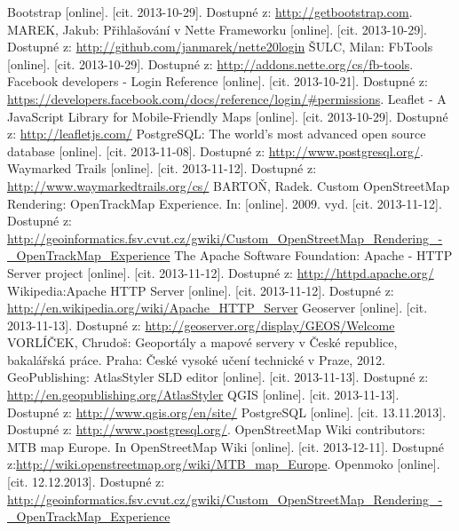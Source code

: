 \documentclass[11pt,a4paper,titlepage,oneside]{book}
\begin{document}
\newpage
{}
\begin{thebibliography}{50}
	Bootstrap [online].  [cit. 2013-10-29]. Dostupné z: \url{http://getbootstrap.com}.
	MAREK, Jakub: Přihlašování v Nette Frameworku [online].  [cit. 2013-10-29]. Dostupné z: \url{http://github.com/janmarek/nette20login}
	 ŠULC, Milan: FbTools [online].  [cit. 2013-10-29]. Dostupné z: \url{http://addons.nette.org/cs/fb-tools}.
	 Facebook developers - Login Reference [online]. [cit. 2013-10-21]. Dostupné z: \url{https://developers.facebook.com/docs/reference/login/#permissions}.
		Leaflet - A JavaScript Library for Mobile-Friendly Maps [online]. [cit. 2013-10-29]. Dostupné z: \url{http://leafletjs.com/}
	 PostgreSQL: The world's most advanced open source database [online]. [cit. 2013-11-08]. Dostupné z: \url{http://www.postgresql.org/}.
	 Waymarked Trails [online].  [cit. 2013-11-12]. Dostupné z: \url{http://www.waymarkedtrails.org/cs/}
	 BARTOŇ, Radek. Custom OpenStreetMap Rendering: OpenTrackMap Experience. In: [online]. 2009. vyd. [cit. 2013-11-12]. Dostupné z: \url{http://geoinformatics.fsv.cvut.cz/gwiki/Custom_OpenStreetMap_Rendering_-_OpenTrackMap_Experience}
	The Apache Software Foundation: Apache - HTTP Server project [online]. [cit. 2013-11-12]. Dostupné z: \url{http://httpd.apache.org/}
	Wikipedia:Apache HTTP Server [online]. [cit. 2013-11-12]. Dostupné z: \url{http://en.wikipedia.org/wiki/Apache_HTTP_Server}
	Geoserver [online]. [cit. 2013-11-13]. Dostupné z: \url{http://geoserver.org/display/GEOS/Welcome}
	VORLÍČEK, Chrudoš: Geoportály a mapové servery v České republice, bakalářská práce. Praha: České vysoké učení technické v Praze, 2012.
	GeoPublishing: AtlasStyler SLD editor [online]. [cit. 2013-11-13]. Dostupné z: \url{http://en.geopublishing.org/AtlasStyler}
	QGIS [online]. [cit. 2013-11-13]. Dostupné z: \url{http://www.qgis.org/en/site/}
	 PostgreSQL [online]. [cit. 13.11.2013]. Dostupné z: \url{http://www.postgresql.org/}.
	OpenStreetMap Wiki contributors:  MTB map Europe. In OpenStreetMap Wiki [online]. [cit. 2013-12-11]. Dostupné z:\url{http://wiki.openstreetmap.org/wiki/MTB_map_Europe}.
	Openmoko [online]. [cit. 12.12.2013]. Dostupné z: \url{http://geoinformatics.fsv.cvut.cz/gwiki/Custom_OpenStreetMap_Rendering_-_OpenTrackMap_Experience}

\end{thebibliography}
\end{document}
